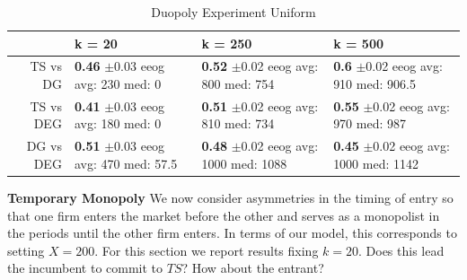 \documentclass{article}
\theoremstyle{definition}
\begin{document}
\begin{table}[ht]
\centering
\caption{Duopoly Experiment Uniform} 
\begin{tabular}{rlll}
  \hline
 & k = 20 & k = 250 & k = 500 \\ 
  \hline
TS vs DG & \makecell{\textbf{0.46} $\pm$0.03\\ eeog \\ avg: 230\\ med: 0} & \makecell{\textbf{0.52} $\pm$0.02\\ eeog \\ avg: 800\\ med: 754} & \makecell{\textbf{0.6} $\pm$0.02\\ eeog \\ avg: 910\\ med: 906.5} \\ 
  TS vs DEG & \makecell{\textbf{0.41} $\pm$0.03\\ eeog \\ avg: 180\\ med: 0} & \makecell{\textbf{0.51} $\pm$0.02\\ eeog \\ avg: 810\\ med: 734} & \makecell{\textbf{0.55} $\pm$0.02\\ eeog \\ avg: 970\\ med: 987} \\ 
  DG vs DEG & \makecell{\textbf{0.51} $\pm$0.03\\ eeog \\ avg: 470\\ med: 57.5} & \makecell{\textbf{0.48} $\pm$0.02\\ eeog \\ avg: 1000\\ med: 1088} & \makecell{\textbf{0.45} $\pm$0.02\\ eeog \\ avg: 1000\\ med: 1142} \\ 
   \hline
\end{tabular}
\label{sim_unif}
\end{table}

\textbf{Temporary Monopoly} We now consider asymmetries in the timing of entry so that one firm enters the market before the other and serves as a monopolist in the periods until the other firm enters. In terms of our model, this corresponds to setting $X = 200$. For this section we report results fixing $k = 20$. Does this lead the incumbent to commit to $TS$? How about the entrant? 
\end{document}
